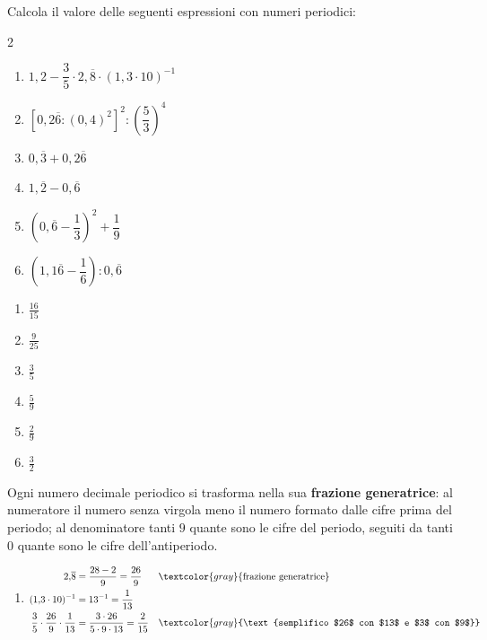 \begin{question}[ID=3.1, subtitle={Espressioni con numeri periodici}, tags={espressioni, periodici}, difficulty=media]
Calcola il valore delle seguenti espressioni con numeri periodici:
\begin{multicols}{2}
\begin{enumerate}[leftmargin=3.2cm]
    \item $1{,}2-\dfrac{3}{5}\cdot2{,}\overline{8}\cdot(1{,}3\cdot10)^{-1}$
    \item $\left[0{,}2\overline{6}:(0{,}4)^2\right]^2:\left(\dfrac{5}{3}\right)^4$
    \item $0{,}\overline{3}+0{,}2\overline{6}$
    \item $1{,}\overline{2}-0{,}\overline{6}$
    \item $\left(0{,}\overline{6}-\dfrac{1}{3}\right)^2+\dfrac{1}{9}$
    \item $\left(1{,}1\overline{6}-\dfrac{1}{6}\right):0{,}\overline{6}$
\end{enumerate}
\end{multicols}
\begin{solution}
\begin{enumerate}
    \item $\tfrac{16}{15}$
    \item $\tfrac{9}{25}$
    \item $\tfrac35$
    \item $\tfrac59$
    \item $\tfrac29$
    \item $\tfrac32$
\end{enumerate}
\end{solution}
\begin{explanation}
Ogni numero decimale periodico si trasforma nella sua \textbf{frazione generatrice}: al numeratore il numero senza virgola meno il numero formato dalle cifre prima del periodo; al denominatore tanti $9$ quante sono le cifre del periodo, seguiti da tanti $0$ quante sono le cifre dell'antiperiodo.
\begin{enumerate}
    \item \[\begin{aligned}
    2{,}\overline{8} &= \dfrac{28-2}{9}=\dfrac{26}{9} && \textcolor{gray}{\text{frazione generatrice}}\\
    (1{,}3\cdot10)^{-1} &= 13^{-1}=\dfrac1{13}\\
    \dfrac35\cdot\dfrac{26}9\cdot\dfrac1{13} &= \dfrac{3\cdot26}{5\cdot9\cdot13}=\dfrac{2}{15} && \textcolor{gray}{\text{semplifico $26$ con $13$ e $3$ con $9$}}\\

\end{aligned}\]
\end{enumerate}
\end{explanation}
\end{question}

